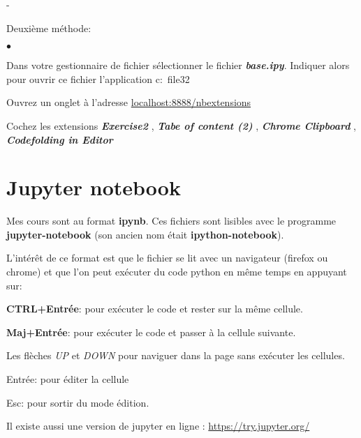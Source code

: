\documentclass[10pt,dvipsnames,  dvips]{article}
\begin{document}
\begin{list}{}{}
\begin{list}{-}{}
\item Deuxième méthode:
\begin{list}{$\bullet$}{}
\item Dans votre gestionnaire de fichier sélectionner le fichier \textbf{\textit{base.ipy}}.
Indiquer alors pour ouvrir ce fichier l'application c:\string\Programme~file32\string\jupyter\string\jupyter
\end{list}
\end{list}

\item Ouvrez un onglet à l'adresse \url{localhost:8888/nbextensions}

Cochez les extensions \textbf{\textit{Exercise2}} , \textbf{\textit{Tabe of content (2)}} , \textbf{\textit{Chrome Clipboard}} , \textbf{\textit{Codefolding in Editor}}
\end{list}



\section{Jupyter notebook}

Mes cours sont au format \textbf{ipynb}. Ces fichiers sont lisibles avec le programme \textbf{jupyter-notebook} (son ancien nom était \textbf{ipython-notebook}).


L'intérêt de ce format est que le fichier se lit avec un navigateur (firefox ou chrome) et que l'on peut exécuter du code python en même temps en appuyant sur:

\begin{list}{}{}
\item \textbf{CTRL+Entrée}: pour exécuter le code et rester sur la même cellule.
\item \textbf{Maj+Entrée}: pour exécuter le code et passer à la cellule suivante.
\item Les flèches \textit{UP} et \textit{DOWN} pour naviguer dans la page sans exécuter les cellules.
\item Entrée:  pour éditer la cellule
\item Esc: pour sortir du mode édition.
\end{list}

\bigskip

Il existe aussi une version de jupyter en ligne :  \url{https://try.jupyter.org/}
\end{document}
